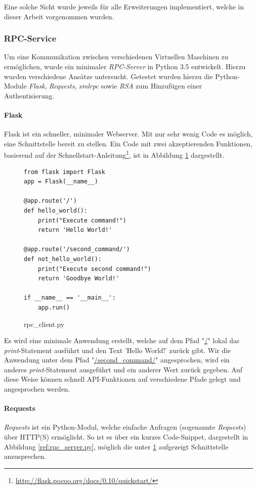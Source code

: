 Eine solche Sicht wurde jeweils für alle Erweiterungen implementiert, welche in dieser Arbeit vorgenommen wurden.

\subsubsection{RPC-Service}
Um eine Kommunikation zwischen verschiedenen Virtuellen Maschinen zu ermöglichen, wurde ein minimaler \textit{RPC-Server} in Python 3.5 entwickelt. Hierzu wurden verschiedene Ansätze untersucht. Getestet wurden hierzu die Python-Module \textit{Flask}, \textit{Requests}, \textit{xmlrpc} sowie \textit{RSA} zum Hinzufügen einer Authentisierung.

\paragraph{Flask}\label{ref:flask}
Flask ist ein schneller, minimaler Webserver. Mit nur sehr wenig Code es möglich, eine Schnittstelle bereit zu stellen. Ein Code mit zwei akzeptierenden Funktionen, basierend auf der Schnellstart-Anleitung\footnote{\url{http://flask.pocoo.org/docs/0.10/quickstart/}}, ist in Abbildung \ref{ref:rpc_client.py} dargestellt.
\begin{figure}
\begin{lstlisting}
from flask import Flask
app = Flask(__name__)

@app.route('/')
def hello_world():
	print("Execute command!")
    return 'Hello World!'
    
@app.route('/second_command/')
def not_hello_world():
	print("Execute second command!")
    return 'Goodbye World!'

if __name__ == '__main__':
    app.run()
\end{lstlisting}
\label{ref:rpc_client.py}
\caption{rpc\_client.py}
\end{figure}

Es wird eine minimale Anwendung erstellt, welche auf dem Pfad "\url{/}" lokal das \textit{print}-Statement ausführt und den Text 'Hello World!' zurück gibt. 
Wir die Anwendung unter dem Pfad "\url{/second_command/}" angesprochen, wird ein anderes \textit{print}-Statement ausgeführt und ein anderer Wert zurück gegeben. Auf diese Weise können schnell API-Funktionen auf verschiedene Pfade gelegt und angesprochen werden.

\paragraph{Requests}
\textit{Requests} ist ein Python-Modul, welche einfache Anfragen (sogenannte \textit{Requests}) über HTTP(S) ermöglicht. So ist es über ein kurzes Code-Snippet, dargestellt in Abbildung \ref{ref:rpc_server.py}, möglich die unter \ref{ref:rpc_client.py} aufgezeigt Schnittstelle anzusprechen.

